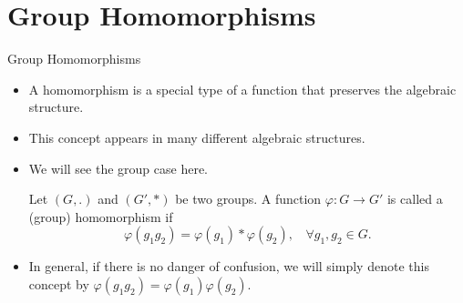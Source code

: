\documentclass[ %
 10pt, xcolor={dvipsnames,svgnames,x11names,hyperref},
   hyperref={colorlinks=true,citecolor=green,linkcolor=DarkRed,urlcolor=ProcessBlue,anchorcolor=blue}
  ]{beamer}
\newenvironment{stepitemize}{\begin{itemize}[<+->]}{\end{itemize} }
\begin{document}
\section{Group Homomorphisms}
\begin{frame}{Group Homomorphisms}
\begin{stepitemize}
    \item A homomorphism is a special type of a function that preserves the algebraic structure.
    \item This concept appears in many different algebraic structures.
    \item We will see the group case here.
    \begin{definition}
    Let $(G,.)$ and $(G',*)$ be two groups. A function $\varphi:G\rightarrow G'$ is called a (group) homomorphism if
$$\varphi(g_1g_2) = \varphi(g_1)*\varphi(g_2), \:\:\:\: \forall g_1, g_2 \in G.$$
    \end{definition}
\item In general, if there is no danger of confusion, we will simply denote this concept by
$\varphi(g_1g_2) = \varphi(g_1)\varphi(g_2)$.
\end{stepitemize}

\end{frame}
\end{document}
